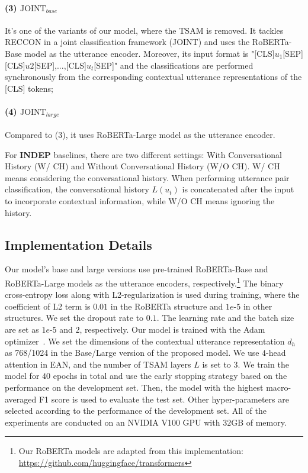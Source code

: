 \documentclass[11pt]{article}
\begin{document}
\paragraph{(3) $\text{JOINT}_{base}$} It's one of the variants of our model, where the TSAM is removed. It tackles RECCON in a joint classification framework (JOINT) and uses the RoBERTa-Base model as the utterance encoder. Moreover, its input format is "[CLS]$u_1$[SEP][CLS]$u2$[SEP],...,[CLS]$u_t$[SEP]" and the classifications are performed synchronously from the corresponding contextual utterance representations of the [CLS] tokens; 
\paragraph{(4) $\text{JOINT}_{large}$} Compared to (3), it uses RoBERTa-Large model as the utterance encoder.

For \textbf{INDEP} baselines, there are two different settings: With Conversational History (W/ CH) and Without Conversational History (W/O CH). W/ CH means considering the conversational history. When performing utterance pair classification, the conversational history $L(u_t)$ is concatenated after the input to incorporate contextual information, while W/O CH means ignoring the history.





\subsection{Implementation Details}
Our model's base and large versions use pre-trained RoBERTa-Base and RoBERTa-Large models as the utterance encoders, respectively.\footnote{Our RoBERTa models are adapted from this implementation: \url{https://github.com/huggingface/transformers}} The binary cross-entropy loss along with L2-regularization is used during training, where the coefficient of L2 term is $0.01$ in the RoBERTa structure and $1e$-$5$ in other structures. We set the dropout rate to $0.1$. The learning rate and the batch size are set as $1e$-$5$ and $2$, respectively. Our model is trained with the Adam optimizer~\citep{kingma2015adam}. We set the dimensions of the contextual utterance representation $d_h$ as 768/1024 in the Base/Large version of the proposed model. We use $4$-$ $head attention in EAN, and the number of TSAM layers $L$ is set to $3$. We train the model for $40$ epochs in total and use the early stopping strategy based on the performance on the development set. Then, the model with the highest macro-averaged F1 score is used to evaluate the test set. Other hyper-parameters are selected according to the performance of the development set. All of the experiments are conducted on an NVIDIA V100 GPU with $32$GB of memory.
\end{document}
